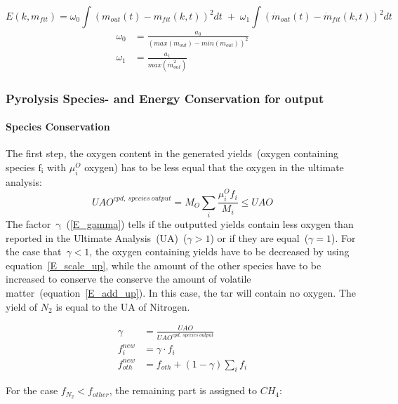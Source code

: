 \begin{equation}\label{E_LS}
 E(k,m_{fit})=\omega_0 \int \left( m_{out}(t) - m_{fit}(k,t) \right)^2 dt \; + \; \omega_1 \int \left( \dot m_{out}(t) - \dot m_{fit}(k,t) \right)^2 dt
\end{equation}
\begin{align}
 \label{E_Weight_Param1}
\omega_0 &= \frac{a_0}{\left( max(m_{out})-min(m_{out}) \right)^2}\\
 \label{E_Weight_Param2}
\omega_1 &= \frac{a_1}{max(\dot{m}_{out}^2)}
\end{align}

\subsubsection{Pyrolysis Species- and Energy Conservation for \CPD output}\label{SSS_ConsEqCPD}

\paragraph{Species Conservation}
The first step, the oxygen content in the generated yields~(oxygen containing species $\mathrm{f_i}$ with $\mu_i^{O}$ oxygen) has to be less equal that the oxygen in the ultimate analysis:
\begin{equation}
 UAO^{cpd, \: species \: output} = M_{O} \sum_i \frac{\mu_i^{O} f_i}{M_i} \le UAO 
 \label{E_O_balance}
\end{equation}
The factor~$\mathrm{\gamma}$~(\ref{E_gamma}) tells if the outputted yields contain less oxygen than reported in the Ultimate Analysis~(UA)~($\gamma > 1$) or if they are equal~($\gamma = 1$). For the case that~$\gamma < 1$, the oxygen containing yields have to be decreased by using equation~\ref{E_scale_up}, while the amount of the other species have to be increased to conserve the conserve the amount of volatile matter~(equation~\ref{E_add_up}). In this case, the tar will contain no oxygen. The yield of $N_2$ is equal to the UA of Nitrogen.

\begin{align}
 \gamma &= \frac{UAO}{UAO^{cpd, \: species \: output}}
 \label{E_gamma}\\
 f_i^{new} &= \gamma \cdot f_i 
 \label{E_scale_up}\\
 f_{oth}^{new} &= f_{oth} + \left(1-\gamma\right) \sum_i f_i
 \label{E_add_up}
\end{align}

For the case $f_{N_2}<f_{other}$, the remaining part is assigned to $CH_4$:

